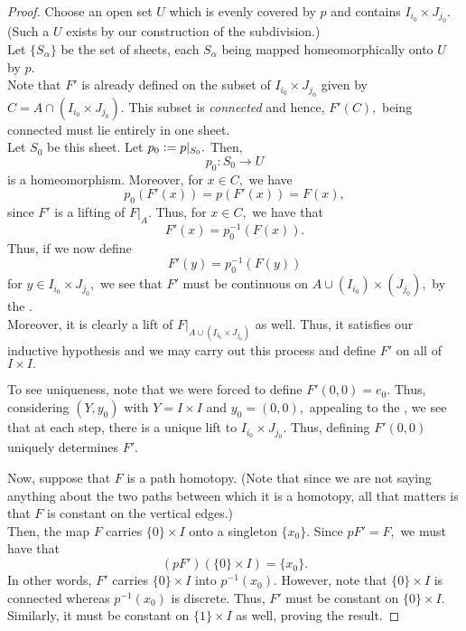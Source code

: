 \documentclass[12pt]{article}
\begin{document}
\begin{proof}
	Choose an open set $U$ which is evenly covered by $p$ and contains $I_{i_0} \times J_{j_0}.$ (Such a $U$ exists by our construction of the subdivision.)\\
	Let $\{S_\alpha\}$ be the set of sheets, each $S_\alpha$ being mapped homeomorphically onto $U$ by $p.$\\
	Note that $F'$ is already defined on the subset of $I_{i_0} \times J_{j_0}$ given by $C = A \cap (I_{i_0} \times J_{j_0}).$ This subset is \emph{connected} and hence, $F'(C),$ being connected must lie entirely in one sheet.\\
	Let $S_0$ be this sheet. Let $p_0 \vcentcolon= p|_{S_0}.$ Then,
	\begin{equation*} 
		p_0 : S_0 \to U
	\end{equation*}
	is a homeomorphism. Moreover, for $x \in C,$ we have
	\begin{equation*} 
		p_0(F'(x)) = p(F'(x)) = F(x),
	\end{equation*}
	since $F'$ is a lifting of $F|_A.$ Thus, for $x \in C,$ we have that
	\begin{equation*} 
		F'(x) = p_0^{-1}(F(x)).
	\end{equation*}
	Thus, if we now define
	\begin{equation*} 
		F'(y) = p_0^{-1}(F(y))
	\end{equation*}
	for $y \in I_{i_0} \times J_{j_0},$ we see that $F'$ must be continuous on $A \cup (I_{i_0}) \times (J_{j_0}),$ by the .\\
	Moreover, it is clearly a lift of $F|_{A \cup (I_{i_0} \times J_{j_0})}$ as well. Thus, it satisfies our inductive hypothesis and we may carry out this process and define $F'$ on all of $I \times I.$

	To see uniqueness, note that we were forced to define $F'(0, 0) = e_0.$ Thus, considering $(Y, y_0)$ with $Y = I \times I$ and $y_0 = (0, 0),$ appealing to the , we see that at each step, there is a unique lift to $I_{i_0} \times J_{j_0}.$ Thus, defining $F'(0, 0)$ uniquely determines $F'.$

	Now, suppose that $F$ is a path homotopy. (Note that since we are not saying anything about the two paths between which it is a homotopy, all that matters is that $F$ is constant on the vertical edges.)\\
	Then, the map $F$ carries $\{0\} \times I$ onto a singleton $\{x_0\}.$ Since $pF' = F,$ we must have that
	\begin{equation*} 
		(pF')(\{0\} \times I) = \{x_0\}.
	\end{equation*}
	In other words, $F'$ carries $\{0\} \times I$ into $p^{-1}(x_0).$ However, note that $\{0\} \times I$ is connected whereas $p^{-1}(x_0)$ is discrete. Thus, $F'$ must be constant on $\{0\} \times I.$\\
	Similarly, it must be constant on $\{1\} \times I$ as well, proving the result.
\end{proof}
\end{document}
